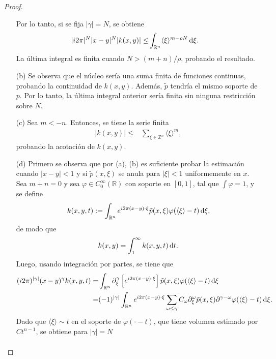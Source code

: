\begin{proof}
\begin{itemize}
		Por lo tanto, si se fija $|\gamma| = N$, se obtiene
		\begin{align*}
			|i2\pi|^N|x-y|^N| k(x, y)| \leq & \int_{\mathbb{R}^n} \langle\xi\rangle^{m-\rho N} \mathop{}\!\mathrm{d} \xi.
		\end{align*}
		La última integral es finita cuando $N > (m + n)/\rho$, probando el resultado.\\
		\item[(b)] Se observa que el núcleo sería una suma finita de funciones continuas, probando la continuidad de $k(x, y)$. Además, $\tilde{p}$ tendría el mismo soporte de $p$. Por lo tanto, la última integral anterior sería finita sin ninguna restricción sobre $N$.\\
		\item[(c)] Sea $ m < -n$. Entonces, se tiene la serie finita
		\begin{align*}
			| k(x, y)| \leq &  \sum_{\xi \in \mathbb{Z}^n}\langle\xi\rangle^m,
		\end{align*}
		probando la acotación de $k(x, y)$.\\
		\item[(d)] Primero se observa que por (a), (b) es suficiente probar la estimación cuando $|x-y|<1$ y si $\tilde{p}(x, \xi)$ se anula para $|\xi|<1$ uniformemente en $x$. Sea $m + n = 0$ y sea $\varphi \in C_0^\infty(\mathbb{R})$ con soporte en $[0, 1]$, tal que $\int \varphi=1$, y se define 
		\begin{equation*}
			k(x, y, t) := \int_{\mathbb{R}^n} e^{i2\pi(x-y)\cdot \xi} \tilde{p}(x, \xi) \varphi(\langle\xi\rangle-t) \mathop{}\!\mathrm{d}\xi,
		\end{equation*}
		de modo que
		\begin{equation*}
			k(x, y) = \int_1^\infty k(x, y, t)\mathop{}\!\mathrm{d} t.
		\end{equation*}
		Luego, usando integración por partes, se tiene que
		\begin{align*}
			(i2\pi)^{|\gamma|}(x - y)^\gamma k(x, y, t) = & \int_{\mathbb{R}^n} \partial^\gamma_\xi\left[ e^{i2\pi(x-y)\cdot \xi} \right] \tilde{p}(x, \xi)\varphi(\langle\xi\rangle - t) \mathop{}\!\mathrm{d} \xi \\
			= & (-1)^{|\gamma|} \int_{\mathbb{R}^n} e^{i2\pi(x-y)\cdot \xi} \sum_{\omega \leq \gamma}C_\omega \partial^\omega_\xi \tilde{p}(x, \xi) \partial^{\gamma - \omega}\varphi(\langle\xi\rangle-t) \mathop{}\!\mathrm{d} \xi.
		\end{align*}
		Dado que $\langle\xi\rangle \sim t$ en el soporte de $\varphi(\cdot-t)$, que tiene volumen estimado por $Ct^{n-1}$, se obtiene para $|\gamma|=N$
		\begin{align*}

\end{align*}
\end{itemize}
\end{proof}
